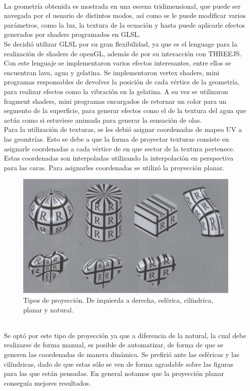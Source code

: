 \documentclass[12pt]{article}
\begin{document}
\\La geometría obtenida es mostrada en una escena tridimensional, que puede ser navegada por el usuario de distintos modos, así como se le puede modificar varios parámetros, como la luz, la textura de la ecuación y hasta puede aplicarle efectos generados por shaders programados en GLSL.
\\Se decidió utilizar GLSL por su gran flexibilidad, ya que es el lenguage para la realización de shaders de openGL, además de por su interacción con THREEJS. Con este lenguaje se implementaron varios efectos interesantes, entre ellos se encuentran lava, agua y gelatina.  Se implementaron vertex shaders, mini programas responsables de devolver la posición de cada vértice de la geometría, para realizar efectos como la vibración en la gelatina. A su vez se utilizaron fragment shaders, mini programas encargados de retornar un color para un segmento de la superficie, para generar efectos como el de la textura del agua que actúa como si estuviese animada para generar la sensación de olas.
\\Para la utilización de texturas, se les debió asignar coordenadas de mapeo UV a las geomtrías. Esto se debe a que la forma de proyectar texturas consiste en asignarle coordenadas a cada vértice de en que sector de la textura pertenece. Estas coordenadas son interpoladas utilizando la interpolación en perspectiva para las caras\cite{realtimerendering}\cite{engine}. Para asignarles coordenadas se utilizó la proyección planar\cite{realtimerendering}.
\begin{figure}[h!]
\includegraphics[width =0.7\linewidth, center]{proyecciones.png}
\caption{Tipos de proyección. De izquierda a derecha, esférica, cilíndrica, planar y natural.}
\label{ fig : surface }
\end{figure}
\\Se optó por este tipo de proyección ya que a diferencia de la natural, la cual debe realizarse de forma manual, es posible de automatizar, de forma de que se generen las coordenadas de manera dinámica. Se prefirió ante las esféricas y las cilíndricas, dado de que estas sólo se ven de forma agradable sobre las figuras para las que están pensadas. En general notamos que la proyección planar conseguía mejores resultados. 
\end{document}
